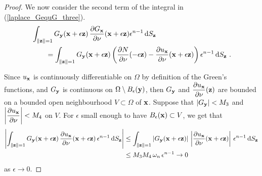 \begin{proof}
We now consider the second term of the integral in
(\ref{laplace_GequG_three}).
\begin{align*}
& \int_{\|\mathbf{z}\|=1}
G_{\mathbf{y}}(\mathbf{x}+\epsilon \mathbf{z})
\,\frac{\partial{G_{\mathbf{x}}}}{\partial \mathbf{\nu}}(\mathbf{x}+\epsilon \mathbf{z})
\epsilon^{n-1}\,\mathrm{d}{S}_{\mathbf{z}} \\
& \qquad = \int_{\|\mathbf{z}\|=1}
G_{\mathbf{y}}(\mathbf{x}+\epsilon \mathbf{z})
\left( \frac{\partial{N}}{\partial \mathbf{\nu}}(-\epsilon \mathbf{z})
- \frac{\partial{u_{\mathbf{x}}}}{\partial \mathbf{\nu}}(\mathbf{x}+\epsilon \mathbf{z}) \right)
\epsilon^{n-1}\,\mathrm{d}{S}_{\mathbf{z}} \ .
\end{align*}

Since $u_{\mathbf{x}}$ is continuously differentiable on $\Omega$ by
definition of the Green's functions, and $G_{\mathbf{y}}$ is continuous
on $\Omega \setminus B_{\epsilon}(\mathbf{y})$, then $G_{\mathbf{y}}$ and
$\displaystyle \frac{\partial{u_{\mathbf{x}}}}{\partial \mathbf{\nu}}(\mathbf{z})$ are bounded on a
bounded open neighbourhood $V \subset \Omega$ of $\mathbf{x}$.  Suppose that
$|G_{\mathbf{y}}| < M_3$ and
$\displaystyle \left| \frac{\partial{u_{\mathbf{x}}}}{\partial \mathbf{\nu}}\right| < M_4$
on $V$.  For $\epsilon$ small enough to have
$B_\epsilon(\mathbf{x}) \subset V$, we get that
\begin{align*}
\left| \int_{\|\mathbf{z}\|=1}
G_{\mathbf{y}}(\mathbf{x}+\epsilon \mathbf{z})
\,\frac{\partial{u_{\mathbf{x}}}}{\partial \mathbf{\nu}}(\mathbf{x}+\epsilon \mathbf{z})
\, \epsilon^{n-1} \,\mathrm{d}{S}_{\mathbf{z}} \right|
& \leq \int_{\|\mathbf{z}\|=1}
\left| G_{\mathbf{y}}(\mathbf{x} + \epsilon \mathbf{z}) \right|
\, \left|\frac{\partial{u_{\mathbf{x}}}}{\partial \mathbf{\nu}}(\mathbf{x}+\epsilon \mathbf{z})
\right| \, \epsilon^{n-1} \,\mathrm{d}{S}_{\mathbf{z}} \\
& \leq M_3 M_4\, \omega_n\, \epsilon^{n-1}  \to 0
\end{align*}
as $\epsilon \to 0$.


\end{proof}
